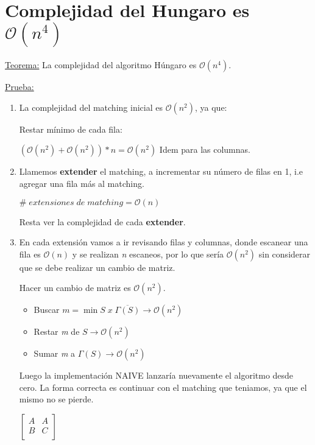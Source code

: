\documentclass[12pt,a4paper]{report}
\begin{document}
		
		
		
	\section{Complejidad del Hungaro es $\mathcal{O}(n^{4})$}
	
		\underline{Teorema:} La complejidad del algoritmo Húngaro es $\mathcal{O}(n^{4})$.
		
		\underline{Prueba:} 
		
			\begin{enumerate}
				\item La complejidad del matching inicial es $\mathcal{O}(n^{2})$, ya que:
				
					Restar mínimo de cada fila:
					\begin{center}
						$(\mathcal{O}(n^{2}) + \mathcal{O}(n^{2})) * n = \mathcal{O}(n^{2})$
						Idem para las columnas.
					\end{center}
				
				\item Llamemos \textbf{extender} el matching, a incrementar su número de filas en 1, i.e agregar una fila más al matching.
				\begin{center}
					$ \# \; extensiones \; de \; matching = \mathcal{O}(n)$
				\end{center}
				
				Resta ver la complejidad de cada \textbf{extender}.
				
				\item En cada extensión vamos a ir revisando filas y columnas, donde escanear una fila es $\mathcal{O}(n)$ y se realizan \textit{n} escaneos, por lo que sería $\mathcal{O}(n^{2})$ sin considerar que se debe realizar un cambio de matriz.
				
				Hacer un cambio de matriz es $\mathcal{O}(n^{2})$.				
				\begin{itemize}
					\item Buscar $\textit{m} = \min S \; x \; \overline{\Gamma(S)} \rightarrow \mathcal{O}(n^{2})$
					\item Restar \textit{m} de $S \rightarrow \mathcal{O}(n^{2})$
					\item Sumar \textit{m} a $\Gamma(S) \rightarrow \mathcal{O}(n^{2})$
				\end{itemize}
				
				Luego la implementación NAIVE lanzaría nuevamente el algoritmo desde cero. La forma correcta es continuar con el matching que teniamos, ya que el mismo no se pierde.
				\begin{center}
				$
				\begin{bmatrix}
				A & A \\
				B  & C \\
				\end{bmatrix}					
				$
				\end{center}
				

\end{enumerate}
\end{document}
